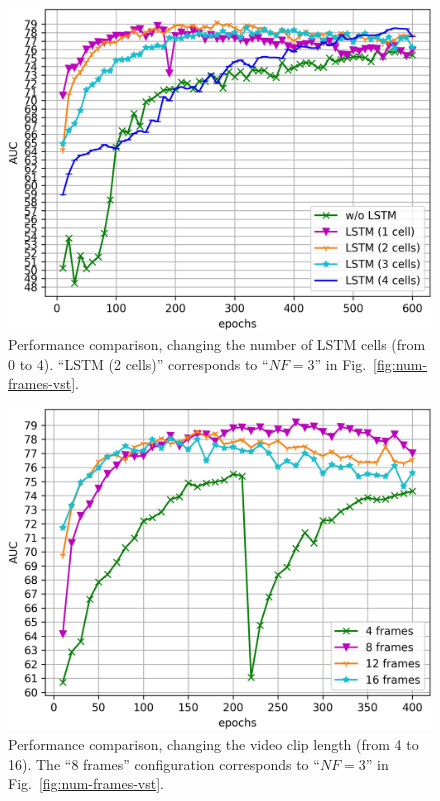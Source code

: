 \begin{figure}[ht!]
\centerline{\includegraphics[clip,width=\figsize]{images/exp_2.jpg}}
	\caption{Performance comparison, changing the number of LSTM cells (from 0 to 4). ``LSTM (2 cells)'' corresponds to ``$\mathit{NF}=3$''  in Fig.~\ref{fig:num-frames-vst}.}
	\label{fig:num-memory-cells}
\end{figure}


\begin{figure}[ht!]
\centerline{\includegraphics[clip,width=\figsize]{images/exp_3.jpg}}
    \caption{Performance comparison, changing the video clip length (from 4 to 16). The ``8 frames'' configuration corresponds to ``$\mathit{NF}=3$'' in Fig.~\ref{fig:num-frames-vst}.\label{fig:random-batch}}
\end{figure}

